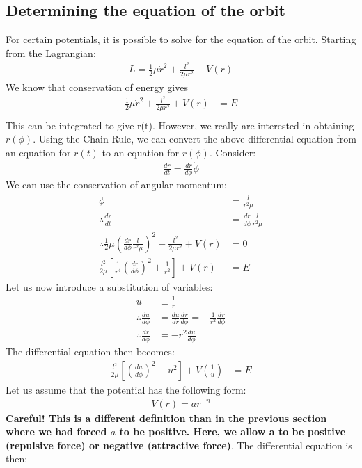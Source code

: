 \subsection{Determining the equation of the orbit}
For certain potentials, it is possible to solve for the equation of the orbit. Starting from the Lagrangian:
\begin{align}
L=\frac{1}{2}\mu\dot{r}^2+\frac{l^2}{2\mu r^2}-V(r)
\end{align}
We know that conservation of energy gives
\begin{align}
\frac{1}{2}\mu\dot{r}^2+\frac{l^2}{2\mu r^2}+V(r)&=E\nonumber\\
\end{align}
This can be integrated to give r(t). However, we really are interested in obtaining $r(\phi)$. Using the Chain Rule, we can convert the above differential equation from an equation for $r(t)$ to an equation for $r(\phi)$. Consider:
\begin{align}
\frac{dr}{dt}=\frac{dr}{d\phi}\dot\phi
\end{align}
We can use the conservation of angular momentum:
\begin{align}
\dot\phi&=\frac{l}{r^2\mu}\nonumber\\
\therefore \frac{dr}{dt}&=\frac{dr}{d\phi}\frac{l}{r^2\mu}\nonumber\\
\therefore \frac{1}{2}\mu\left( \frac{dr}{d\phi}\frac{l}{r^2\mu} \right)^2+\frac{l^2}{2\mu r^2}+V(r)&=0\nonumber\\
\frac{l^2}{2\mu}\left[\frac{1}{r^4}\left( \frac{dr}{d\phi} \right)^2+\frac{1}{r^2}\right]+V(r)&=E
\end{align}
Let us now introduce a substitution of variables:
\begin{align}
u&\equiv \frac{1}{r}\nonumber\\
\therefore \frac{du}{d\phi}&=\frac{du}{dr} \frac{dr}{d\phi}= -\frac{1}{r^2} \frac{dr}{d\phi} \nonumber\\
\therefore \frac{dr}{d\phi}&=-r^2\frac{du}{d\phi}
\end{align}
The differential equation then becomes:
\begin{align}
\frac{l^2}{2\mu}\left[\left( \frac{du}{d\phi} \right)^2+u^2\right]+V(\frac{1}{u})&=E
\end{align}
Let us assume that the potential has the following form:
\begin{align}
V(r)=ar^{-n}
\end{align}
\textbf{Careful! This is a different definition than in the previous section where we had forced $a$ to be positive. Here, we allow a to be positive (repulsive force) or negative (attractive force)}. The differential equation is then:
